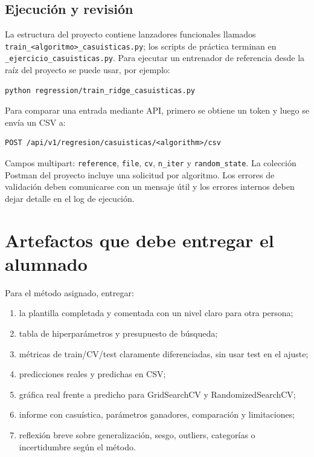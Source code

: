 \documentclass[11pt,a4paper]{article}
\begin{document}
\subsection{Ejecución y revisión}
La estructura del proyecto contiene lanzadores funcionales llamados \texttt{train\_<algoritmo>\_casuisticas.py}; los scripts de práctica terminan en \texttt{\_ejercicio\_casuisticas.py}. Para ejecutar un entrenador de referencia desde la raíz del proyecto se puede usar, por ejemplo:
\begin{lstlisting}
python regression/train_ridge_casuisticas.py
\end{lstlisting}
Para comparar una entrada mediante API, primero se obtiene un token y luego se envía un CSV a:
\begin{lstlisting}
POST /api/v1/regresion/casuisticas/<algorithm>/csv
\end{lstlisting}
Campos multipart: \texttt{reference}, \texttt{file}, \texttt{cv}, \texttt{n\_iter} y \texttt{random\_state}. La colección Postman del proyecto incluye una solicitud por algoritmo. Los errores de validación deben comunicarse con un mensaje útil y los errores internos deben dejar detalle en el log de ejecución.

\section{Artefactos que debe entregar el alumnado}
Para el método asignado, entregar:
\begin{enumerate}
\item la plantilla completada y comentada con un nivel claro para otra persona;
\item tabla de hiperparámetros y presupuesto de búsqueda;
\item métricas de train/CV/test claramente diferenciadas, sin usar test en el ajuste;
\item predicciones reales y predichas en CSV;
\item gráfica real frente a predicho para GridSearchCV y RandomizedSearchCV;
\item informe con casuística, parámetros ganadores, comparación y limitaciones;
\item reflexión breve sobre generalización, sesgo, outliers, categorías o incertidumbre según el método.
\end{enumerate}
\end{document}
